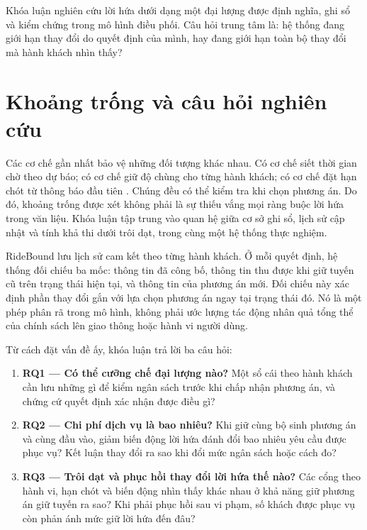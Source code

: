 \begin{khungy}
Khóa luận nghiên cứu lời hứa dưới dạng một đại lượng được định nghĩa, ghi sổ và kiểm chứng
trong mô hình điều phối. Câu hỏi trung tâm là: hệ thống đang giới hạn thay đổi do quyết định
của mình, hay đang giới hạn toàn bộ thay đổi mà hành khách nhìn thấy?
\end{khungy}

\section{Khoảng trống và câu hỏi nghiên cứu}

Các cơ chế gần nhất bảo vệ những đối tượng khác nhau. Có cơ chế siết thời gian chờ theo dự
báo; có cơ chế giữ độ chùng cho từng hành khách; có cơ chế đặt hạn chót từ thông báo đầu
tiên \cite{fielbaum2020,elmi2026,schulz2026}. Chúng đều có thể kiểm tra khi chọn phương án.
Do đó, khoảng trống được xét không phải là sự thiếu vắng mọi ràng buộc lời hứa trong văn liệu.
Khóa luận tập trung vào quan hệ giữa cơ sở ghi sổ, lịch sử cập nhật và tính khả thi dưới
trôi dạt, trong cùng một hệ thống thực nghiệm.

RideBound lưu lịch sử cam kết theo từng hành khách. Ở mỗi quyết định, hệ thống đối chiếu
ba mốc: thông tin đã công bố, thông tin thu được khi giữ tuyến cũ trên trạng thái hiện tại,
và thông tin của phương án mới. Đối chiếu này xác định phần thay đổi gắn với lựa chọn
phương án ngay tại trạng thái đó. Nó là một phép phân rã trong mô hình, không phải ước
lượng tác động nhân quả tổng thể của chính sách lên giao thông hoặc hành vi người dùng.

Từ cách đặt vấn đề ấy, khóa luận trả lời ba câu hỏi:

\begin{enumerate}[leftmargin=1.2cm,itemsep=5pt,topsep=4pt]
\item \textbf{RQ1 --- Có thể cưỡng chế đại lượng nào?} Một sổ cái theo hành khách cần lưu
những gì để kiểm ngân sách trước khi chấp nhận phương án, và chứng cứ quyết định xác nhận
được điều gì?
\item \textbf{RQ2 --- Chi phí dịch vụ là bao nhiêu?} Khi giữ cùng bộ sinh phương án và
cùng đầu vào, giảm biến động lời hứa đánh đổi bao nhiêu yêu cầu được phục vụ? Kết luận thay
đổi ra sao khi đổi mức ngân sách hoặc cách đo?
\item \textbf{RQ3 --- Trôi dạt và phục hồi thay đổi lời hứa thế nào?} Các cổng theo hành vi,
hạn chót và biến động nhìn thấy khác nhau ở khả năng giữ phương án giữ tuyến ra sao? Khi
phải phục hồi sau vi phạm, số khách được phục vụ còn phản ánh mức giữ lời hứa đến đâu?
\end{enumerate}

